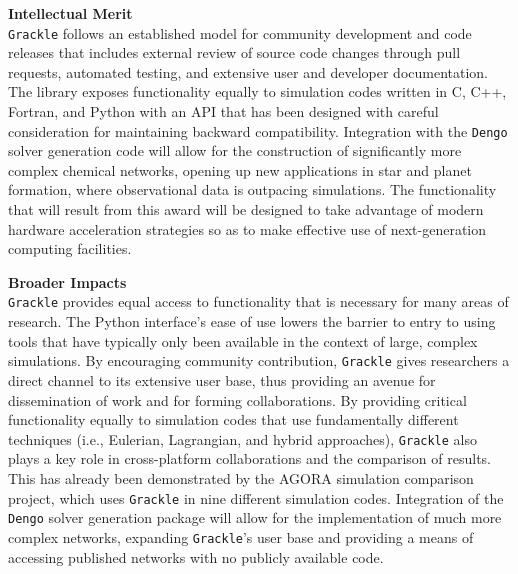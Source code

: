 \documentclass[11pt]{article}
\newcommand{\grackle}{\texttt{Grackle}}
\newcommand{\dengo}{\texttt{Dengo}}
\begin{document}
\begin{flushleft}
\noindent
{\bf \large Intellectual Merit}\\
\grackle{} follows an established model for community development and
code releases that includes external review of source code changes
through pull requests, automated testing, and extensive user and
developer documentation.  The library exposes functionality equally to
simulation codes written in C, C++, Fortran, and Python with an API
that has been designed with careful consideration for maintaining
backward compatibility.  Integration with the \dengo{} solver
generation code will allow for the construction of significantly more
complex chemical networks, opening up new applications in star and
planet formation, where observational data is outpacing simulations.
The functionality that will result from this award will be designed to
take advantage of modern hardware acceleration strategies so as to
make effective use of next-generation computing facilities.


\noindent
{\bf \large Broader Impacts}\\
\grackle{} provides equal access to functionality that is
necessary for many areas of research.  The Python interface's ease of
use lowers the barrier to entry to using tools that have
typically only been available in the context of large, complex
simulations.  By encouraging community contribution, \grackle{} gives
researchers a direct channel to its extensive user base, thus
providing an avenue for dissemination of work and for forming
collaborations.  By providing critical functionality equally to
simulation codes that use fundamentally different techniques (i.e.,
Eulerian, Lagrangian, and hybrid approaches), \grackle{}
also plays a key role in cross-platform collaborations and the
comparison of results.  This has already been demonstrated by the
AGORA simulation comparison project, which uses \grackle{} in nine
different simulation codes.  Integration of the \dengo{} solver
generation package will allow for the implementation of much more
complex networks, expanding \grackle{'s} user base and providing a
means of accessing published networks with no publicly available
code.


\end{flushleft}
\end{document}

